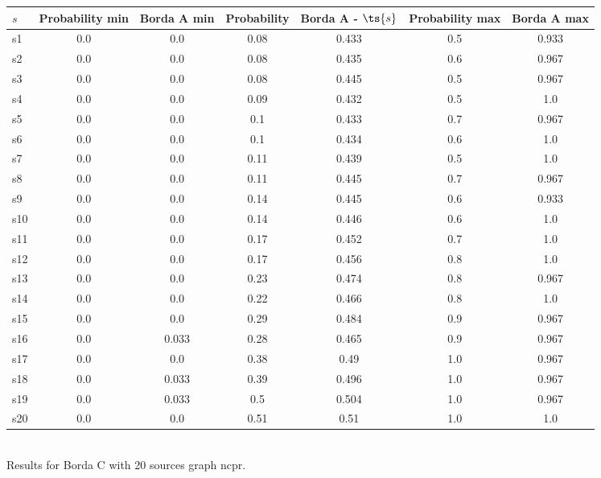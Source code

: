 \documentclass{article}
\begin{document}
\noindent\begin{tabular}{|l|c|c|c|c|c|c|}
\hline
$s$& Probability min & Borda A min & Probability & Borda A - $\ts{s}$ & Probability max & Borda A max\\
\hline
s1 &0.0 & 0.0 & 0.08 & 0.433 & 0.5 & 0.933\\
\hline
s2 &0.0 & 0.0 & 0.08 & 0.435 & 0.6 & 0.967\\
\hline
s3 &0.0 & 0.0 & 0.08 & 0.445 & 0.5 & 0.967\\
\hline
s4 &0.0 & 0.0 & 0.09 & 0.432 & 0.5 & 1.0\\
\hline
s5 &0.0 & 0.0 & 0.1 & 0.433 & 0.7 & 0.967\\
\hline
s6 &0.0 & 0.0 & 0.1 & 0.434 & 0.6 & 1.0\\
\hline
s7 &0.0 & 0.0 & 0.11 & 0.439 & 0.5 & 1.0\\
\hline
s8 &0.0 & 0.0 & 0.11 & 0.445 & 0.7 & 0.967\\
\hline
s9 &0.0 & 0.0 & 0.14 & 0.445 & 0.6 & 0.933\\
\hline
s10 &0.0 & 0.0 & 0.14 & 0.446 & 0.6 & 1.0\\
\hline
s11 &0.0 & 0.0 & 0.17 & 0.452 & 0.7 & 1.0\\
\hline
s12 &0.0 & 0.0 & 0.17 & 0.456 & 0.8 & 1.0\\
\hline
s13 &0.0 & 0.0 & 0.23 & 0.474 & 0.8 & 0.967\\
\hline
s14 &0.0 & 0.0 & 0.22 & 0.466 & 0.8 & 1.0\\
\hline
s15 &0.0 & 0.0 & 0.29 & 0.484 & 0.9 & 0.967\\
\hline
s16 &0.0 & 0.033 & 0.28 & 0.465 & 0.9 & 0.967\\
\hline
s17 &0.0 & 0.0 & 0.38 & 0.49 & 1.0 & 0.967\\
\hline
s18 &0.0 & 0.033 & 0.39 & 0.496 & 1.0 & 0.967\\
\hline
s19 &0.0 & 0.033 & 0.5 & 0.504 & 1.0 & 0.967\\
\hline
s20 &0.0 & 0.0 & 0.51 & 0.51 & 1.0 & 1.0\\
\hline
\end{tabular}\\

\noindent Results for Borda C with 20 sources graph ncpr.
\end{document}
